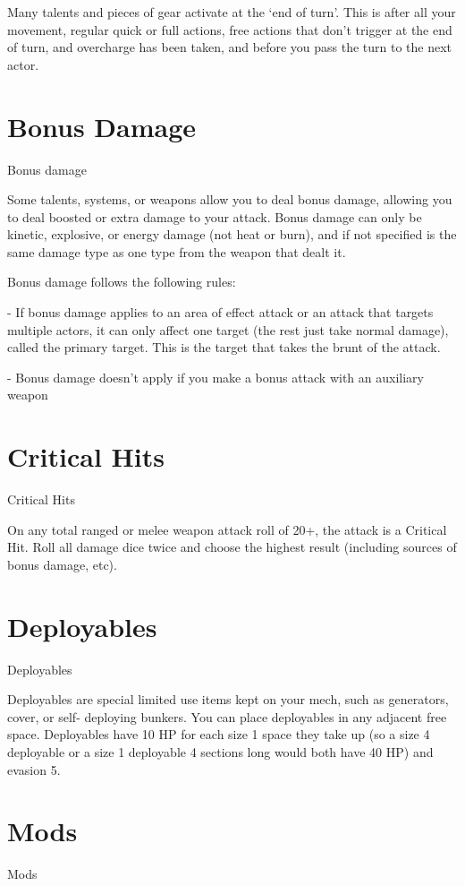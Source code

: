 Many talents and pieces of gear activate at the ‘end of turn’. This is after all your movement,
regular quick or full actions, free actions that don’t trigger at the end of turn, and overcharge has
been taken, and before you pass the turn to the next actor.

\section{Bonus Damage}
\hypertarget{BonusDamage}{Bonus damage}

Some talents, systems, or weapons allow you to deal bonus damage, allowing you to deal
boosted or extra damage to your attack. Bonus damage can only be kinetic, explosive, or energy
damage (not heat or burn), and if not specified is the same damage type as one type from the
weapon that dealt it.

Bonus damage follows the following rules:

         	- If bonus damage applies to an area of effect attack or an attack that targets multiple
         actors, it can only affect one target (the rest just take normal damage), called the primary
         target. This is the target that takes the brunt of the attack.

         	- Bonus damage doesn’t apply if you make a bonus attack with an auxiliary weapon

\section{Critical Hits}
\hypertarget{CriticalHit}{Critical Hits}

On any total ranged or melee weapon attack roll of 20+, the attack is a Critical Hit. Roll all
damage dice twice and choose the highest result (including sources of bonus damage, etc).
\section{Deployables}
\hypertarget{Deployable}{Deployables}

Deployables are special limited use items kept on your mech, such as generators, cover, or self-
deploying bunkers. You can place deployables in any adjacent free space. Deployables have 10
HP for each size 1 space they take up (so a size 4 deployable or a size 1 deployable 4 sections
long would both have 40 HP) and evasion 5.
\section{Mods}
\hypertarget{Mod}{Mods}

